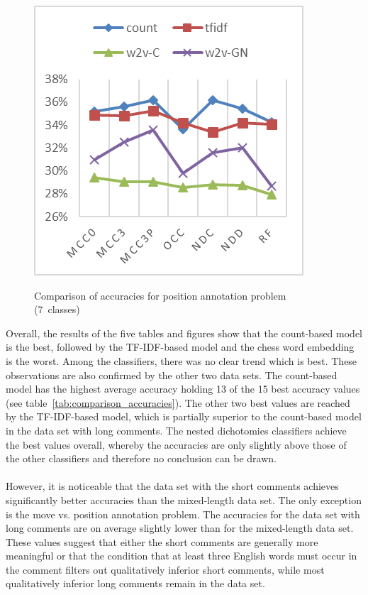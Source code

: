 \documentclass[article,type=msc,colorback,accentcolor=tud7b]{tudthesis}
\begin{document}
\begin{figure}[H]
\begin{floatrow}
{	    \includegraphics{images/position_2}
      }{%
	    \caption{Comparison of accuracies for position annotation problem (7~classes)}
        \label{fig:position_2}
      }
      \end{floatrow}
    \end{figure}

Overall, the results of the five tables and figures show that the count-based model is the best, followed by the TF-IDF-based model and the chess word embedding is the worst. Among the classifiers, there was no clear trend which is best. These observations are also confirmed by the other two data sets. The count-based model has the highest average accuracy holding 13 of the 15 best accuracy values (see table~\ref{tab:comparison_accuracies}). The other two best values are reached by the TF-IDF-based model, which is partially superior to the count-based model in the data set with long comments. The nested dichotomies classifiers achieve the best values overall, whereby the accuracies are only slightly above those of the other classifiers and therefore no conclusion can be drawn. \\\\
However, it is noticeable that the data set with the short comments achieves significantly better accuracies than the mixed-length data set. The only exception is the move vs. position annotation problem. The accuracies for the data set with long comments are on average slightly lower than for the mixed-length data set. These values suggest that either the short comments are generally more meaningful or that the condition that at least three English words must occur in the comment filters out qualitatively inferior short comments, while most qualitatively inferior long comments remain in the data set.
\end{document}

